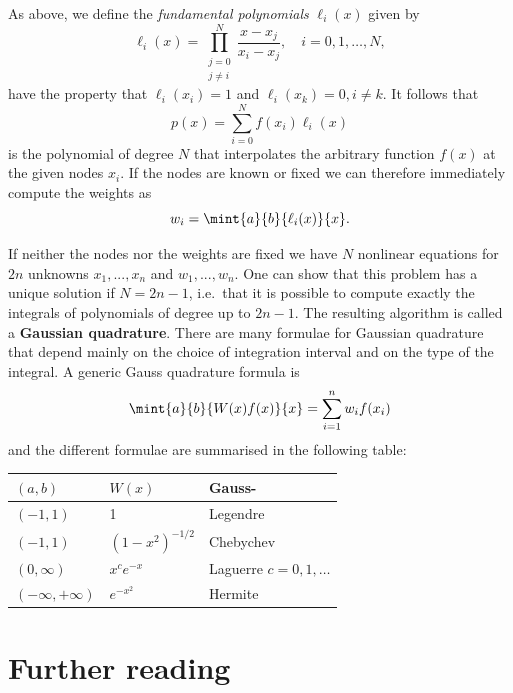 As above, we define the \textit{fundamental polynomials}
$\ell_i(x)$ given by
%
\begin{equation}
  \ell_i(x) = \prod_{\substack{j = 0\\j \ne i}}^N \frac{x - x_j}{x_i -
    x_j}, \quad i = 0, 1, \dots, N,
\end{equation}
%
have the property that $\ell_i(x_i) = 1$ and $\ell_i(x_k) = 0, i \ne
k$. It follows that
%
\begin{equation}
  p(x) = \sum_{i=0}^N f(x_i) \ell_i(x)
\end{equation}
%
is the polynomial of degree $N$ that interpolates the arbitrary
function $f(x)$ at the given nodes $x_i$. If the nodes are known or
fixed we can therefore immediately compute the weights as
%
\begin{equation}
  w_i = \mint{a}{b}{\ell_i(x)}{x}.
\end{equation}
%

If neither the nodes nor the weights are fixed we have $N$ nonlinear
equations for $2n$ unknowns $x_1,...,x_n$ and $w_1,...,w_n$.  One can
show that this problem has a unique solution if $N=2n-1$, i.e.\ that it
is possible to compute exactly the integrals of polynomials of degree
up to $2 n - 1$.  The resulting algorithm is called a {\bf Gaussian
  quadrature}.  There are many formulae for Gaussian quadrature that
depend mainly on the choice of integration interval and on the type of
the integral.  A generic Gauss quadrature formula is
%
\begin{equation}
  \mint{a}{b}{W(x) f(x)}{x} = \sum_{i=1}^n w_i f(x_i)
\end{equation}
%
and the different formulae are summarised in the following table:

\begin{center}
 \begin{tabular}{lll} \hline
  $(a,b)$ & $W(x)$ & Gauss- \\ \hline
  $(-1,1)$ & 1 & Legendre \\
  $(-1,1)$ & $(1-x^2)^{-1/2}$ & Chebychev \\
  $(0,\infty)$ & $x^c e^{-x}$ & Laguerre $c=0,1,\ldots$ \\
  $(-\infty,+\infty)$ & $e^{-x^2}$ & Hermite \\ \hline
 \end{tabular}
\end{center}

\section*{Further reading}

